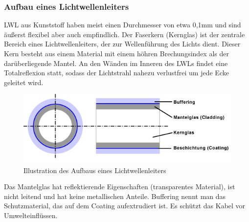 \documentclass[11pt, a4paper]{article}
\begin{document}
\subsubsection{Aufbau eines Lichtwellenleiters}
LWL aus Kunststoff haben meist einen Durchmesser von etwa 0,1mm und sind äußerst flexibel aber
auch empfindlich. Der Faserkern (Kernglas) ist der zentrale Bereich eines Lichtwellenleiters, der zur
Wellenführung des Lichts dient. Dieser Kern  besteht aus einem Material mit einem höhren Brechungsindex
als der darüberliegende Mantel. An den Wänden im Inneren des LWLs findet eine Totalreflexion statt,
sodass der Lichtstrahl nahezu verlustfrei um jede Ecke geleitet wird. 

\begin{figure}[h!]
	\centering
	\includegraphics[width=1.0\textwidth]{images/lwl}
	\caption{Illustration des Aufbaus eines Lichtwellenleiters \cite{lwl-img}}
\end{figure}

Das Mantelglas hat reflektierende Eigenschaften (transparentes Material), ist nicht leitend und hat keine metallischen
Anteile. Buffering nennt man das Schutzmaterial, das auf dem Coating aufextrudiert ist. Es schützt
das Kabel vor Umwelteinflüssen.
\end{document}
